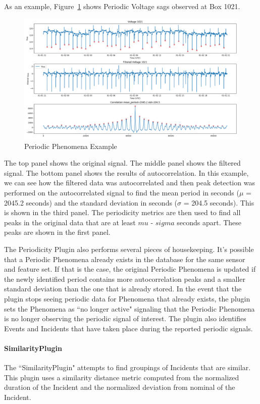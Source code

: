 As an example, Figure~\ref{fig:periodic_example} shows Periodic Voltage sags observed at Box 1021.

\begin{figure}[h]
	\centering
	\includegraphics[width=\linewidth]{figures/periodic_example.png}
	\caption{Periodic Phenomena Example}
	\label{fig:periodic_example}
\end{figure}

The top panel shows the original signal. The middle panel shows the filtered signal. The bottom panel shows the results of autocorrelation. In this example, we can see how the filtered data was autocorrelated and then peak detection was performed on the autocorrelated signal to find the mean period in seconds ($\mu$ = 2045.2 seconds) and the standard deviation in seconds ($\sigma$ = 204.5 seconds). This is shown in the third panel. The periodicity metrics are then used to find all peaks in the original data that are at least $mu$ - $sigma$ seconds apart. These peaks are shown in the first panel.

The Periodicity Plugin also performs several pieces of housekeeping. It's possible that a Periodic Phenomena already exists in the database for the same sensor and feature set. If that is the case, the original Periodic Phenomena is updated if the newly identified period contains more autocorrelation peaks and a smaller standard deviation than the one that is already stored. In the event that the plugin stops seeing periodic data for Phenomena that already exists, the plugin sets the Phenomena as ``no longer active" signaling that the Periodic Phenomena is no longer observing the periodic signal of interest. The plugin also identifies Events and Incidents that have taken place during the reported periodic signals.

\paragraph{SimilarityPlugin}
The ``SimilarityPlugin" attempts to find groupings of Incidents that are similar. This plugin uses a similarity distance metric computed from the normalized duration of the Incident and the normalized deviation from nominal of the Incident.

